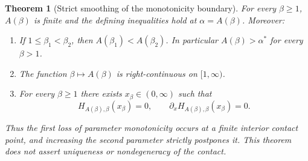 \documentclass[11pt,a4paper]{article}
\theoremstyle{plain}
\newtheorem{theorem}{Theorem}[section]
\theoremstyle{remark}
\begin{document}
\begin{theorem}[Strict smoothing of the monotonicity boundary]
\label{thm:beta-hierarchy}
For every $\beta\geq1$, $A(\beta)$ is finite and the defining inequalities
hold at $\alpha=A(\beta)$. Moreover:
\begin{enumerate}
\item If $1\leq\beta_1<\beta_2$, then $A(\beta_1)<A(\beta_2)$.
In particular $A(\beta)>\alpha^*$ for every $\beta>1$.
\item The function $\beta\mapsto A(\beta)$ is right-continuous on $[1,\infty)$.
\item For every $\beta\geq1$ there exists $x_\beta\in(0,\infty)$ such that
\[
 H_{A(\beta),\beta}(x_\beta)=0,
 \qquad
 \partial_xH_{A(\beta),\beta}(x_\beta)=0.
\]
\end{enumerate}
Thus the first loss of parameter monotonicity occurs at a finite interior
contact point, and increasing the second parameter strictly postpones it.
This theorem does not assert uniqueness or nondegeneracy of the contact.
\end{theorem}
\end{document}
